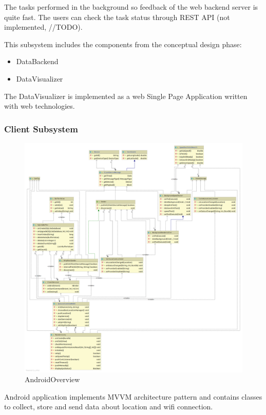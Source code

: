 The tasks performed in the background so feedback of the web backend
server is quite fast. The users can check the task status through REST
API (not implemented, //TODO).

This subsystem includes the components from the conceptual design phase:

\begin{itemize}
\item
  DataBackend
\item
  DataVisualizer
\end{itemize}

The DataVisualizer is implemented as a web Single Page Application
written with web technologies.

\subsubsection{Client Subsystem}\label{client-subsystem}

\begin{figure}[!h]
	\centering
	\includegraphics[width=\linewidth]{schemes/classes/android/class.png}
\caption{AndroidOverview}
\end{figure}

Android application implements MVVM architecture pattern and contains
classes to collect, store and send data about location and wifi
connection.

